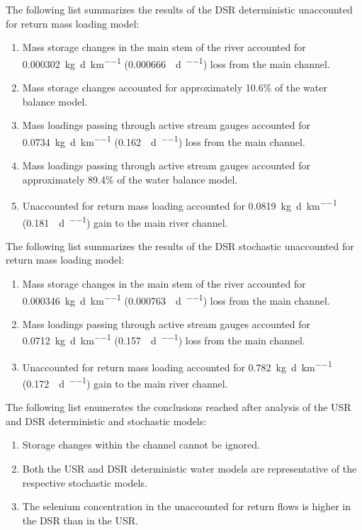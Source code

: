 \begin{linenumbers}
The following list summarizes the results of the DSR deterministic unaccounted for return mass loading model:
\begin{enumerate}
	\item Mass storage changes in the main stem of the river accounted for \SI{0.000302}{\kilo\g\per\day\per\kilo\m} (\SI{0.000666}{\pound\per\day\per\mile}) loss from the main channel.
	\item Mass storage changes accounted for approximately 10.6\% of the water balance model.
	\item Mass loadings passing through active stream gauges accounted for \SI{0.0734}{\kilo\g\per\day\per\kilo\m} (\SI{0.162}{\pound\per\day\per\mile}) loss from the main channel.
	\item Mass loadings passing through active stream gauges accounted for approximately 89.4\% of the water balance model.
	\item Unaccounted for return mass loading accounted for \SI{0.0819}{\kilo\g\per\day\per\kilo\m} (\SI{0.181}{\pound\per\day\per\mile}) gain to the main river channel.
\end{enumerate}

The following list summarizes the results of the DSR stochastic unaccounted for return mass loading model:
\begin{enumerate}
	\item Mass storage changes in the main stem of the river accounted for \SI{0.000346}{\kilo\g\per\day\per\kilo\m} (\SI{0.000763}{\pound\per\day\per\mile}) loss from the main channel.
	\item Mass loadings passing through active stream gauges accounted for \SI{0.0712}{\kilo\g\per\day\per\kilo\m} (\SI{0.157}{\pound\per\day\per\mile}) loss from the main channel.
	\item Unaccounted for return mass loading accounted for \SI{0.782}{\kilo\g\per\day\per\kilo\m} (\SI{0.172}{\pound\per\day\per\mile}) gain to the main river channel.
\end{enumerate}

The following list enumerates the conclusions reached after analysis of the USR and DSR deterministic and stochastic models:
\begin{enumerate}
	\item Storage changes within the channel cannot be ignored.
	\item Both the USR and DSR deterministic water models are representative of the respective stochastic models.
	\item The selenium concentration in the unaccounted for return flows is higher in the DSR than in the USR.
\end{enumerate}
\clearpage{}


\end{linenumbers}
